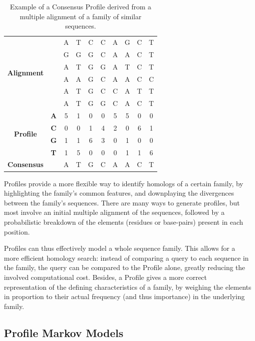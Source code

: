 \begin{table}[h!]
\centering
\caption[Consensus Profile example] {Example of a Consensus Profile derived from a multiple alignment of a family of similar sequences.}
\label{consensus-profile}

\begin{tabular}{cccccccccc}
\multirow{6}{*}{\textbf{Alignment}} &  & A & T & C & C & A & G & C & T \\
&  & G & G & G & C & A & A & C & T \\
&  & A & T & G & G & A & T & C & T \\
&  & A & A & G & C & A & A & C & C \\
&  & A & T & G & C & C & A & T & T \\
&  & A & T & G & G & C & A & C & T \\
\hline
\multirow{4}{*}{\textbf{Profile }} & \textbf{A} & 5 & 1 & 0 & 0 & 5 & 5 & 0 & 0 \\
& \textbf{C} & 0 & 0 & 1 & 4 & 2 & 0 & 6 & 1 \\
& \textbf{G} & 1 & 1 & 6 & 3 & 0 & 1 & 0 & 0 \\
& \textbf{T} & 1 & 5 & 0 & 0 & 0 & 1 & 1 & 6 \\
\hline
\textbf{Consensus} &  & A & T & G & C & A & A & C & T \\
\end{tabular}
\end{table}

Profiles provide a more flexible way to identify homologs of a certain family, by highlighting the family's common features, and downplaying the divergences between the family's sequences. There are many ways to generate profiles, but most involve an initial multiple alignment of the sequences, followed by a probabilistic breakdown of the elements (residues or base-pairs) present in each position.

Profiles can thus effectively model a whole sequence family. This allows for a more efficient homology search: instead of comparing a query to each sequence in the family, the query can be compared to the Profile alone, greatly reducing the involved computational cost. Besides, a Profile gives a more correct representation of the defining characteristics of a family, by weighing the elements in proportion to their actual frequency (and thus importance) in the underlying family.



\subsection{Profile Markov Models}

